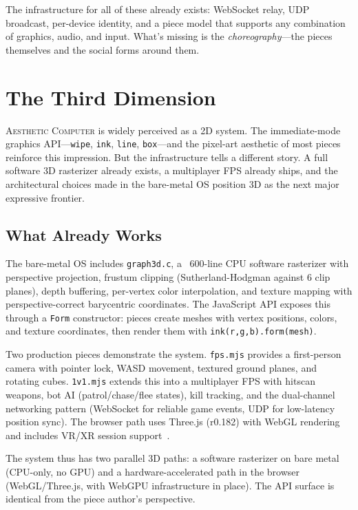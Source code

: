 \documentclass[10pt,letterpaper,twocolumn]{article}
\newcommand{\ac}{\textsc{Aesthetic Computer}}
\begin{document}
The infrastructure for all of these already exists: WebSocket relay, UDP broadcast, per-device identity, and a piece model that supports any combination of graphics, audio, and input. What's missing is the \emph{choreography}---the pieces themselves and the social forms around them.


\section{The Third Dimension}
\label{sec:3d}

\ac{} is widely perceived as a 2D system. The immediate-mode graphics API---\texttt{wipe}, \texttt{ink}, \texttt{line}, \texttt{box}---and the pixel-art aesthetic of most pieces reinforce this impression. But the infrastructure tells a different story. A full software 3D rasterizer already exists, a multiplayer FPS already ships, and the architectural choices made in the bare-metal OS position 3D as the next major expressive frontier.

\subsection{What Already Works}

The bare-metal OS includes \texttt{graph3d.c}, a ~600-line CPU software rasterizer with perspective projection, frustum clipping (Sutherland-Hodgman against 6 clip planes), depth buffering, per-vertex color interpolation, and texture mapping with perspective-correct barycentric coordinates. The JavaScript API exposes this through a \texttt{Form} constructor: pieces create meshes with vertex positions, colors, and texture coordinates, then render them with \texttt{ink(r,g,b).form(mesh)}.

Two production pieces demonstrate the system. \texttt{fps.mjs} provides a first-person camera with pointer lock, WASD movement, textured ground planes, and rotating cubes. \texttt{1v1.mjs} extends this into a multiplayer FPS with hitscan weapons, bot AI (patrol/chase/flee states), kill tracking, and the dual-channel networking pattern (WebSocket for reliable game events, UDP for low-latency position sync). The browser path uses Three.js (r0.182) with WebGL rendering and includes VR/XR session support~\citep{sutherland1968head}.

The system thus has two parallel 3D paths: a software rasterizer on bare metal (CPU-only, no GPU) and a hardware-accelerated path in the browser (WebGL/Three.js, with WebGPU infrastructure in place). The API surface is identical from the piece author's perspective.
\end{document}
